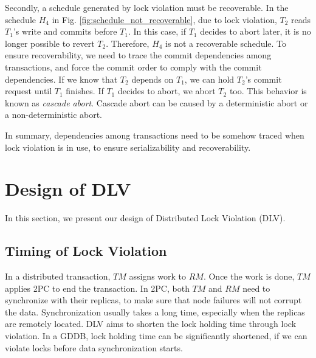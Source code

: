 \documentclass[conference]{IEEEtran}
\begin{document}
Secondly, a schedule generated by lock violation must be recoverable.
In the schedule ${H_4}$ in Fig.   \ref{fig:schedule_not_recoverable}, due to lock violation,
${T_2}$ reads  ${T_1}$'s write and commits before ${T_1}$.
In this case, if ${T_1}$ decides to abort later, it is no longer possible to revert ${T_2}$.
Therefore, ${H_4}$ is not a recoverable schedule.
To ensure recoverability, we need to trace the commit dependencies among transactions, and force the commit order to comply with the commit dependencies.
If we know that ${T_2}$ depends on ${T_1}$, we can hold ${T_2}$'s commit request until ${T_1}$ finishes.
If ${T_1}$ decides to abort, we abort ${T_2}$ too.
This behavior is known as \emph{cascade abort}.
Cascade abort can be caused by a deterministic abort or a non-deterministic abort.

In summary, dependencies among transactions need to be somehow traced when lock violation is in use, to ensure serializability and recoverability.

\section{Design of DLV}
\label{sec:implement}

In this section, we present our design of Distributed Lock Violation (DLV).

\subsection {Timing of Lock Violation}


In a distributed transaction, $TM$ assigns work to $RM$. Once the work is done, $TM$ applies 2PC to end the transaction.
In 2PC, both $TM$ and $RM$ need to synchronize with their replicas, to make sure that node failures will not corrupt the data.
Synchronization usually takes a long time, especially when the replicas are remotely located.
DLV aims to shorten the lock holding time through lock violation.
In a GDDB, lock holding time can be significantly shortened, if we can violate locks before data synchronization starts.
\end{document}
